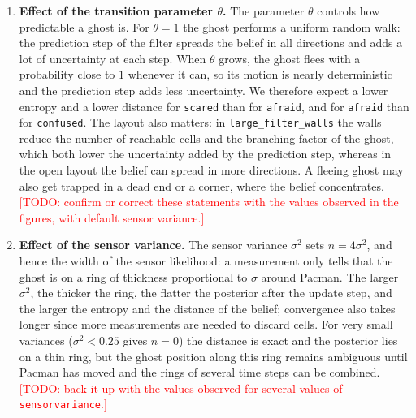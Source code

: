 \documentclass{article}
\begin{document}
\begin{enumerate}[label=\alph*.,leftmargin=*]
    \begin{figure}[h]
        \centering
        \caption{Results on \texttt{large\_filter\_walls}.}
    \end{figure}

    \item \textbf{Effect of the transition parameter $\theta$.}
    The parameter $\theta$ controls how predictable a ghost is. For
    $\theta=1$ the ghost performs a uniform random walk: the prediction step
    of the filter spreads the belief in all directions and adds a lot of
    uncertainty at each step. When $\theta$ grows, the ghost flees with a
    probability close to $1$ whenever it can, so its motion is nearly
    deterministic and the prediction step adds less uncertainty. We therefore
    expect a lower entropy and a lower distance for \texttt{scared} than for
    \texttt{afraid}, and for \texttt{afraid} than for \texttt{confused}. The
    layout also matters: in \texttt{large\_filter\_walls} the walls reduce the
    number of reachable cells and the branching factor of the ghost, which
    both lower the uncertainty added by the prediction step, whereas in the open
    layout the belief can spread in more directions. A fleeing ghost may also
    get trapped in a dead end or a corner, where the belief concentrates.
    \textcolor{red}{[TODO: confirm or correct these statements with
    the values observed in the figures, with default sensor variance.]}

    \item \textbf{Effect of the sensor variance.}
    The sensor variance $\sigma^2$ sets $n=4\sigma^2$, and hence the width
    of the sensor likelihood: a measurement only tells that the ghost is on a
    ring of thickness proportional to $\sigma$ around Pacman. The larger
    $\sigma^2$, the thicker the ring, the flatter the posterior after the
    update step, and the larger the entropy and the distance of the belief;
    convergence also takes longer since more measurements are needed to
    discard cells. For very small variances ($\sigma^2<0.25$ gives $n=0$) the
    distance is exact and the posterior lies on a thin ring, but the ghost
    position along this ring remains ambiguous until Pacman has moved
    and the rings of several time steps can be combined.
    \textcolor{red}{[TODO: back it up with the values observed for
    several values of \texttt{--sensorvariance}.]}


\end{enumerate}
\end{document}
